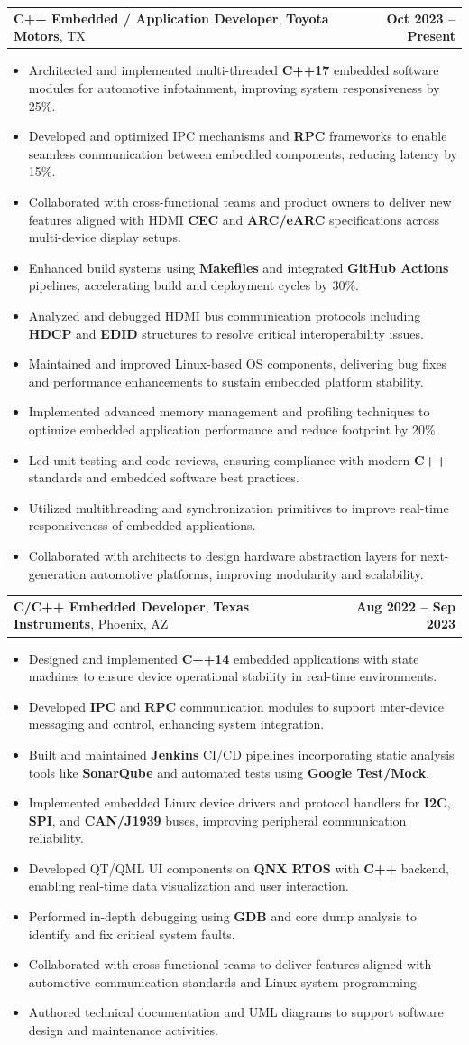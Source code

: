 \documentclass[letterpaper,11pt]{article}
\makeatletter
\newcommand{\resumeItem}[1]{
  \item\footnotesize{
    {#1 \vspace{-2pt}}
  }
}
\newcommand{\resumeSubheading}[4]{
  \vspace{-2pt}\item
    \begin{tabular*}{1.0\textwidth}[t]{l@{\extracolsep{\fill}}r}
      \textbf{\fontsize{10pt}{14pt}\selectfont #3}, \textbf{\fontsize{10pt}{14pt}\selectfont #1}, \fontsize{10pt}{14pt}\selectfont #4 & \textbf{\fontsize{10pt}{14pt}\selectfont #2} \\
    \end{tabular*}\vspace{-7pt}
}
\newcommand{\resumeItemListStart}{\begin{itemize}[leftmargin=*]}
\newcommand{\resumeItemListEnd}{\end{itemize}\vspace{-5pt}}
\makeatother
\begin{document}
    \resumeSubheading
        {Toyota Motors}{Oct 2023 -- Present}
        {C++ Embedded / Application Developer}{TX}
      \resumeItemListStart
        \resumeItem{Architected and implemented multi-threaded \textbf{C++17} embedded software modules for automotive infotainment, improving system responsiveness by 25\%.}
        \resumeItem{Developed and optimized IPC mechanisms and \textbf{RPC} frameworks to enable seamless communication between embedded components, reducing latency by 15\%.}
        \resumeItem{Collaborated with cross-functional teams and product owners to deliver new features aligned with HDMI \textbf{CEC} and \textbf{ARC/eARC} specifications across multi-device display setups.}
        \resumeItem{Enhanced build systems using \textbf{Makefiles} and integrated \textbf{GitHub Actions} pipelines, accelerating build and deployment cycles by 30\%.}
        \resumeItem{Analyzed and debugged HDMI bus communication protocols including \textbf{HDCP} and \textbf{EDID} structures to resolve critical interoperability issues.}
        \resumeItem{Maintained and improved Linux-based OS components, delivering bug fixes and performance enhancements to sustain embedded platform stability.}
        \resumeItem{Implemented advanced memory management and profiling techniques to optimize embedded application performance and reduce footprint by 20\%.}
        \resumeItem{Led unit testing and code reviews, ensuring compliance with modern \textbf{C++} standards and embedded software best practices.}
        \resumeItem{Utilized multithreading and synchronization primitives to improve real-time responsiveness of embedded applications.}
        \resumeItem{Collaborated with architects to design hardware abstraction layers for next-generation automotive platforms, improving modularity and scalability.}
      \resumeItemListEnd

    \resumeSubheading
        {Texas Instruments}{Aug 2022 -- Sep 2023}
        {C/C++ Embedded Developer}{Phoenix, AZ}
      \resumeItemListStart
        \resumeItem{Designed and implemented \textbf{C++14} embedded applications with state machines to ensure device operational stability in real-time environments.}
        \resumeItem{Developed \textbf{IPC} and \textbf{RPC} communication modules to support inter-device messaging and control, enhancing system integration.}
        \resumeItem{Built and maintained \textbf{Jenkins} CI/CD pipelines incorporating static analysis tools like \textbf{SonarQube} and automated tests using \textbf{Google Test/Mock}.}
        \resumeItem{Implemented embedded Linux device drivers and protocol handlers for \textbf{I2C}, \textbf{SPI}, and \textbf{CAN/J1939} buses, improving peripheral communication reliability.}
        \resumeItem{Developed QT/QML UI components on \textbf{QNX RTOS} with \textbf{C++} backend, enabling real-time data visualization and user interaction.}
        \resumeItem{Performed in-depth debugging using \textbf{GDB} and core dump analysis to identify and fix critical system faults.}
        \resumeItem{Collaborated with cross-functional teams to deliver features aligned with automotive communication standards and Linux system programming.}
        \resumeItem{Authored technical documentation and UML diagrams to support software design and maintenance activities.}
      \resumeItemListEnd
\end{document}
